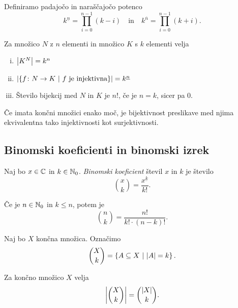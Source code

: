 \begin{definicija}
Definiramo padajočo in naraščajočo potenco
\[
k^{\underline{n}} = \prod_{i=0}^{n-1} (k - i)
\quad \text{in} \quad
k^{\overline{n}} = \prod_{i=0}^{n-1} (k + i).
\]
\end{definicija}

\begin{trditev}
Za množico $N$ z $n$ elementi in množico $K$ s $k$ elementi velja

\begin{enumerate}[i)]
\item $\left\lvert K^N\right\rvert = k^n$
\item $\left\lvert \left\{f \colon N \to K~\middle\vert~\text{$f$ je injektivna}\right\}\right\rvert =
k^{\underline{n}}$
\item Število bijekcij med $N$ in $K$ je $n!$, če je $n = k$, sicer
pa $0$.
\end{enumerate}
\end{trditev}

\obvs

\begin{opomba}
Če imata končni množici enako moč, je bijektivnost preslikave med
njima ekvivalentna tako injektivnosti kot surjektivnosti.
\end{opomba}

\newpage

\subsection{Binomski koeficienti in binomski izrek}


\begin{definicija}
Naj bo $x \in \mathbb{C}$ in $k \in \mathbb{N}_0$.
\emph{Binomski koeficient} števil $x$ in
$k$ je število
\[
\binom{x}{k} = \frac{x^{\underline{k}}}{k!}.
\]
\end{definicija}

\begin{trditev}
Če je $n \in \mathbb{N}_0$ in $k \leq n$, potem je
\[
\binom{n}{k} = \frac{n!}{k! \cdot (n-k)!}.
\]
\end{trditev}

\obvs

\begin{definicija}
Naj bo $X$ končna množica. Označimo
\[
\binom{X}{k} = \left\{A \subseteq X~\middle\vert~\left\lvert A\right\rvert = k\right\}.
\]
\end{definicija}

\begin{trditev}
Za končno množico $X$ velja
\[
\left\lvert \binom{X}{k}\right\rvert = \binom{\left\lvert X\right\rvert}{k}.
\]
\end{trditev}


